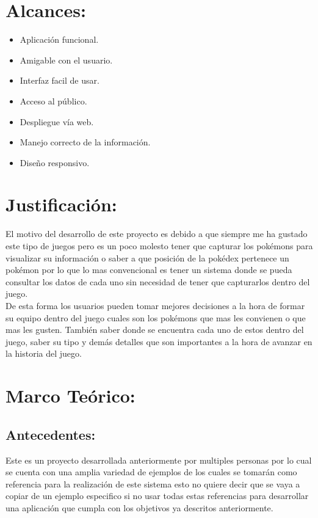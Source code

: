 \documentclass[12pt]{article}
\begin{document}
    \section{Alcances:}
        \begin{itemize}
            \item Aplicación funcional.
            \item Amigable con el usuario.
            \item Interfaz facil de usar.
            \item Acceso al público.
            \item Despliegue vía web.
            \item Manejo correcto de la información.
            \item Diseño responsivo.
        \end{itemize}

    \section{Justificación: }
    El motivo del desarrollo de este proyecto es debido a que siempre me ha gustado este tipo de juegos pero es un poco molesto tener que capturar los pokémons para visualizar su información o saber a que posición de la pokédex pertenece un pokémon por lo que lo mas convencional es tener un sistema donde se pueda consultar los datos de cada uno sin necesidad de tener que capturarlos dentro del juego.\vspace{0.5cm}
    \\
    De esta forma los usuarios pueden tomar mejores decisiones a la hora de formar su equipo dentro del juego cuales son los pokémons que mas les convienen o que mas les gusten. También saber donde se encuentra cada uno de estos dentro del juego, saber su tipo y demás detalles que son importantes a la hora de avanzar en la historia del juego.\vspace{0.5cm}
    \\

    \section{Marco Teórico: }
        \subsection{Antecedentes:}
            Este es un proyecto desarrollada anteriormente por multiples personas por lo cual se cuenta con una amplia variedad de ejemplos de los cuales se tomarán como referencia para la realización de este sistema esto no quiere decir que se vaya a copiar de un ejemplo especifico si no usar todas estas referencias para desarrollar una aplicación que cumpla con los objetivos ya descritos anteriormente.
\end{document}
